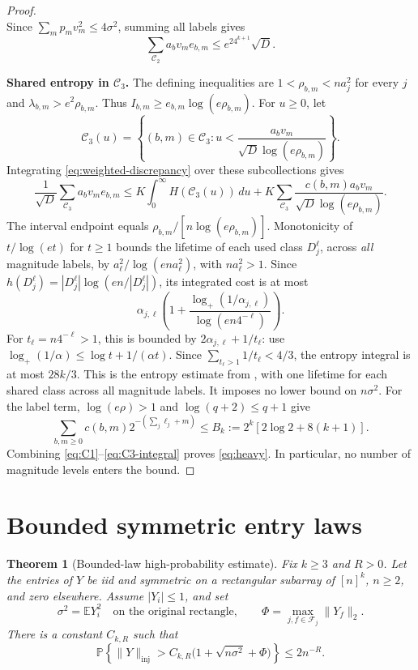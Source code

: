 \documentclass[11pt]{article}
\theoremstyle{spaced}
\newtheorem{theorem}{Theorem}[section]
\theoremstyle{remark}
\numberwithin{equation}{section}
\newcommand{\E}{\mathbb E}
\newcommand{\Pp}{\mathbb P}
\newcommand{\inj}{\mathrm{inj}}
\newcommand{\step}[1]{\par\addvspace{0.5\baselineskip}\noindent\textbf{#1}\enspace}
\begin{document}
\begin{proof}
\[\]
Since $\sum_mp_mv_m^2\le4\sigma^2$, summing all labels gives
\begin{equation}\label{eq:C2}
 \sum_{\mathcal C_2}a_bv_me_{b,m}\le e^24^{k+1}\sqrt D.
\end{equation}
\step{Shared entropy in $\mathcal C_3$.}
The defining inequalities are $1<\rho_{b,m}<na_j^2$ for every $j$ and
$\lambda_{b,m}>e^2\rho_{b,m}$. Thus
$I_{b,m}\ge e_{b,m}\log(e\rho_{b,m})$.
For $u\ge0$, let
\[
 \mathcal C_3(u)=\left\{(b,m)\in\mathcal C_3:
  u<\frac{a_bv_m}{\sqrt D\log(e\rho_{b,m})}\right\}.
\]
Integrating \eqref{eq:weighted-discrepancy} over these subcollections gives
\begin{equation}\label{eq:C3-integral}
 \frac1{\sqrt D}\sum_{\mathcal C_3}a_bv_me_{b,m}
 \le K\int_0^\infty H(\mathcal C_3(u))\,du
    +K\sum_{\mathcal C_3}
          \frac{c(b,m)a_bv_m}{\sqrt D\log(e\rho_{b,m})}.
\end{equation}
The interval endpoint equals $\rho_{b,m}/[n\log(e\rho_{b,m})]$.
Monotonicity of $t/\log(et)$ for $t\ge1$ bounds the lifetime of each
used class $D_j^\ell$, across \emph{all} magnitude labels, by
$a_\ell^2/\log(ena_\ell^2)$, with $na_\ell^2>1$.
Since $h(D_j^\ell)=|D_j^\ell|\log(en/|D_j^\ell|)$, its integrated cost is at most
\[
 \alpha_{j,\ell}
 \left(1+\frac{\log_+(1/\alpha_{j,\ell})}{\log(en4^{-\ell})}\right).
\]
For $t_\ell=n4^{-\ell}>1$, this is bounded by
$2\alpha_{j,\ell}+1/t_\ell$: use
$\log_+(1/\alpha)\le\log t+1/(\alpha t)$.
Since $\sum_{t_\ell>1}1/t_\ell<4/3$, the entropy integral is at most
$28k/3$. This is the entropy estimate from \cite[Appendix~A]{ZZ},
with one lifetime for each shared class across all magnitude labels.
It imposes no lower bound on $n\sigma^2$.
For the label term, $\log(e\rho)>1$ and $\log(q+2)\le q+1$ give
\[
 \sum_{b,m\ge0}c(b,m)2^{-(\sum_j\ell_j+m)}
 \le B_k:=2^k[2\log2+8(k+1)].
\]
Combining \eqref{eq:C1}--\eqref{eq:C3-integral} proves
\eqref{eq:heavy}. In particular, no number of magnitude levels enters
the bound.
\end{proof}

\section{Bounded symmetric entry laws}\label{sec:bounded}

\begin{theorem}[Bounded-law high-probability estimate]\label{thm:bounded}
Fix $k\ge3$ and $R>0$. Let the entries of $Y$ be iid and symmetric on
a rectangular subarray of $[n]^k$, $n\ge2$, and zero elsewhere.
Assume $|Y_i|\le1$, and set
\[
 \sigma^2=\E Y_i^2\quad\text{on the original rectangle},
 \qquad \Phi=\max_{j,f\in\mathcal F_j}\|Y_f\|_2.
\]
There is a constant $C_{k,R}$ such that
\begin{equation}\label{eq:bounded-hp}
 \Pp\!\left\{\|Y\|_{\inj}>
 C_{k,R}\bigl(1+\sqrt{n\sigma^2}+\Phi\bigr)\right\}\le2n^{-R}.
\end{equation}
\end{theorem}
\end{document}
